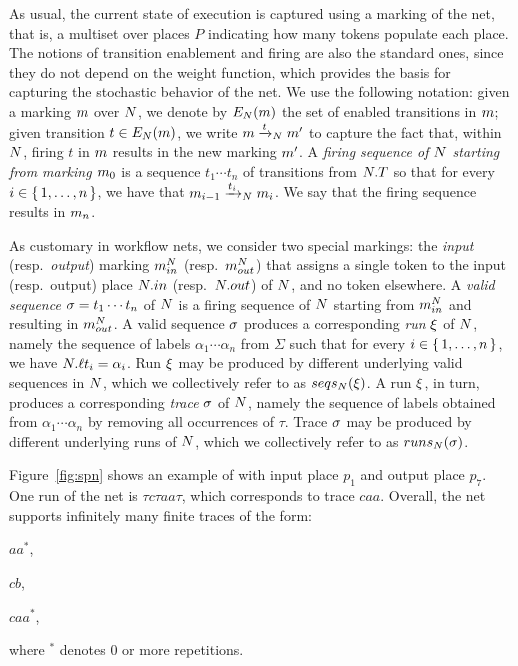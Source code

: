As usual, the current state of execution is captured using a marking of the net, that is, a multiset over places $P$ indicating how many tokens populate each place.
The notions of transition enablement and firing are also the standard ones, since they do not depend on the weight function, which provides the basis for capturing the stochastic behavior of the net. We use the following notation: given a marking $m$ over \uswn $N$, we denote by $E_{N}(m)$ the set of enabled transitions in $m$; given transition $t \in E_{N}(m)$, we write $m\xrightarrow{t}_{N}m'$ to capture the fact that, within $N$, firing $t$ in $m$ results in the new marking $m'$. A \emph{firing sequence of $N$ starting from marking $m_0$} is a sequence $t_1\cdots t_n$ of transitions from $N.T$ so that for every $i \in \set{1,\ldots,n}$, we have that $m_{i-1}\xrightarrow{t_i}_{N}m_{i}$. We say that the firing sequence results in $m_{n}$.

As customary in workflow nets, we consider two special markings: the \emph{input} (resp.~\emph{output}) marking $m_{in}^{N}$ (resp.~$m_{out}^{N}$) that assigns a single token to the input (resp.~output) place $N.in$ (resp.~$N.out$) of $N$, and no token elsewhere. A \emph{valid sequence} $\sigma = t_1\cdots t_n$ of $N$ is a firing sequence of $N$ starting from $m_{in}^{N}$ and resulting in $m_{out}^{N}$. A valid sequence $\sigma$ produces a corresponding \emph{run} $\xi$ of $N$, namely the sequence of labels $\alpha_1 \cdots \alpha_n$ from $\Sigma$ such that for every $i \in \set{1,\ldots,n}$, we have $N.\ell{t_i} = \alpha_i$. Run $\xi$ may be produced by different underlying valid sequences in $N$, which we collectively refer to as $seqs_{N}(\xi)$. A run $\xi$, in turn, produces a corresponding \emph{trace} $\sigma$ of $N$, namely the sequence of labels obtained from $\alpha_1 \cdots \alpha_n$ by removing all occurrences of $\tau$. Trace $\sigma$ may be produced by different underlying runs of $N$, which we collectively refer to as $runs_{N}(\sigma)$.
\begin{example}
\label{ex:net}
  Figure~\eqref{fig:spn} shows an example of \uswn with input place $p_1$ and output place $p_7$. One run of the net is $\tau c \tau a a \tau$, which corresponds to trace $caa$. Overall, the net supports infinitely many finite traces of the form:
\begin{inparaenum}[\it (i)]
\item $aa^*$,
\item $cb$,
\item $caa^*$,
\end{inparaenum}
where $^*$ denotes 0 or more repetitions.
\end{example}

